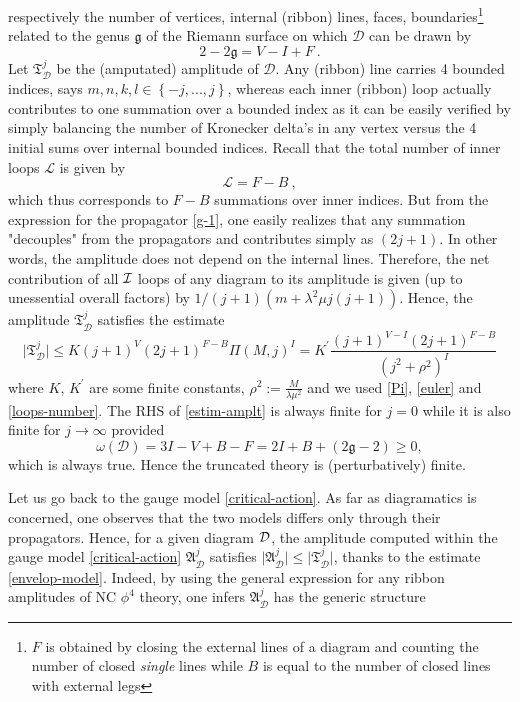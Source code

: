 \documentclass[a4paper,11pt,twoside]{article}
\numberwithin{equation}{section}
\theoremstyle{nonumberplain}
\newcounter{and}
\begin{document}
respectively the number of vertices, internal (ribbon) lines, faces, boundaries{\footnote{$F$ is obtained by closing the external lines of a diagram and counting the number of closed {\it{single}} lines while $B$ is equal to the number of closed lines with external legs}} related to the genus $\mathfrak{g}$ of the Riemann surface on which $\mathcal{D}$ can be drawn by%
%
\begin{equation}
2-2\mathfrak{g}=V-I+F \ . \label{euler}
\end{equation}
%
Let $\mathfrak{T}^j_{\mathcal{D}}$ be the (amputated) amplitude of $\mathcal{D}$. Any (ribbon) line carries 4 bounded indices, says $m,n,k,l\in\left\{-j,...,j\right\}$, whereas each inner (ribbon) loop actually contributes to one summation over a bounded index as it can be easily verified by simply balancing the number of Kronecker delta's in any vertex versus the 4 initial sums over internal bounded indices. Recall that the total number of inner loops $\mathcal{L}$ is given by%
%
\begin{equation}
\mathcal{L}=F-B \ , \label{loops-number}
\end{equation}
%
which thus corresponds to $F-B$ summations over inner indices. But from the expression for the propagator \eqref{g-1}, one easily realizes that any summation "decouples" from the propagators and contributes simply as $(2j+1)$. In other words, the amplitude does not depend on the internal lines. Therefore, the net contribution of all ${\cal{I}}$ loops of any diagram to its amplitude is given (up to unessential overall factors) by $1/(j+1)(m+\lambda^2\mu j(j+1))$. Hence, the amplitude $\mathfrak{T}^j_\mathcal{D}$ satisfies the estimate%
%
\begin{equation}
\vert \mathfrak{T}^j_{\mathcal{D}}\vert \le K(j+1)^V(2j+1)^{F-B}\Pi(M,j)^I=K^\prime\frac{(j+1)^{V-I}(2j+1)^{F-B}}{(j^2+\rho^2)^{I}}\label{estim-amplt}
\end{equation}
%
where $K$, $K^\prime$ are some finite constants, $\rho^2:=\frac{M}{\lambda\mu^2}$ and we used \eqref{Pi}, \eqref{euler} and \eqref{loops-number}. The RHS of \eqref{estim-amplt} is always finite for $j=0$ while it is also finite for $j\to\infty$ provided%
%
\begin{equation}
\omega(\mathcal{D})=3I-V+B-F=2I+B+(2\mathfrak{g}-2)\ge0,\label{power-count}
\end{equation}
%
which is always true. Hence the truncated theory is (perturbatively) finite.\par%
%
Let us go back to the gauge model \eqref{critical-action}. As far as diagramatics is concerned, one observes that the two models differs only through their propagators. Hence, for a given diagram ${\cal{D}}$, the amplitude computed within the gauge model \eqref{critical-action} $\mathfrak{A}^j_{\mathcal{D}}$ satisfies $\vert \mathfrak{A}^j_{\mathcal{D}}\vert\le \vert \mathfrak{T}^j_{\mathcal{D}}\vert$, thanks to the estimate \eqref{envelop-model}. Indeed, by using the general expression for any ribbon amplitudes of NC $\phi^4$ theory, one infers $\mathfrak{A}^j_{\mathcal{D}}$ has the generic structure%
\end{document}
